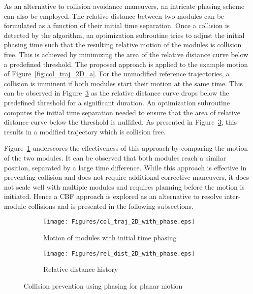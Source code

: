 As an alternative to collision avoidance maneuvers, an intricate phasing scheme can also be employed. The relative distance between two modules can be formulated as a function of their initial time separation. Once a collision is detected by the algorithm, an optimization subroutine tries to adjust the initial phasing time such that the resulting relative motion of the modules is collision free. This is achieved by minimizing the area of the relative distance curve below a predefined threshold. The proposed approach is applied to the example motion of Figure~\ref{fig:col_traj_2D_a}. For the unmodified reference trajectories, a collision is imminent if both modules start their motion at the same time. This can be observed in Figure~\ref{fig:col_traj_2D_with_phase_b} as the relative distance curve drops below the predefined threshold for a significant duration. An optimization subroutine computes the initial time separation needed to ensure that the area of relative distance curve below the threshold is nullified. As presented in Figure~\ref{fig:col_traj_2D_with_phase_b}, this results in a modified trajectory which is collision free. 

Figure~\ref{fig:col_traj_2D_with_phase_a} underscores the effectiveness of this approach by comparing the motion of the two modules. It can be observed that both modules reach a similar position, separated by a large time difference. While this approach is effective in preventing collision and does not require additional corrective maneuvers, it does not scale well with multiple modules and requires planning before the motion is initiated. Hence a CBF approach is explored as an alternative to resolve inter-module collisions and is presented in the following subsections.

\begin{figure}[t!]
     \begin{subfigure}[b]{0.51\textwidth}
        \centering
         \texttt{[image: Figures/col\_traj\_2D\_with\_phase.eps]}
         \caption{Motion of modules with initial time phasing}\label{fig:col_traj_2D_with_phase_a}
     \end{subfigure}   
     \begin{subfigure}[b]{0.48\textwidth}
        \centering
         \texttt{[image: Figures/rel\_dist\_2D\_with\_phase.eps]}
         \caption{Relative distance history}\label{fig:col_traj_2D_with_phase_b}
     \end{subfigure}
     \centering
    \caption{Collision prevention using phasing for planar motion}
\end{figure}

